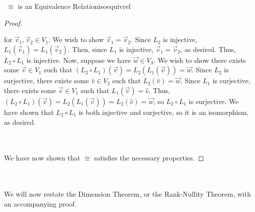 \begin{theorem}{\Stop\,\,\(\cong\) is an Equivalence Relation}{isoequivrel}
\begin{proof}
\begin{enumerate}
                    for \(\vec{v}_1,\vec{v}_2\in V_1\). We wish to show \(\vec{v}_1=\vec{v}_2\). Since \(L_2\) is injective, \(L_1(\vec{v}_1)=L_1(\vec{v}_2)\). Then, since \(L_1\) is injective, \(\vec{v}_1=\vec{v}_2\), as desired. Thus, \(L_2\circ L_1\) is injective. Now, suppose we have \(\vec{w}\in V_3\). We wish to show there exists some \(\vec{v}\in V_1\) such that \((L_2\circ L_1)(\vec{v})=L_2(L_1(\vec{v}))=\vec{w}\). Since \(L_2\) is surjective, there exists some \(\hat{v}\in V_2\) such that \(L_2(\hat{v})=\vec{w}\). Since \(L_1\) is surjective, there exists some \(\vec{v}\in V_1\) such that \(L_1(\vec{v})=\hat{v}\). Thus, \((L_2\circ L_1)(\vec{v})=L_2(L_1(\vec{v}))=L_2(\hat{v})=\vec{w}\), so \(L_2\circ L_1\) is surjective. We have shown that \(L_2\circ L_1\) is both injective and surjective, so it is an isomorphism, as desired.
                \end{enumerate}
                \vphantom
                \\
                \\
                We have now shown that \(\cong\) satisfies the necessary properties.
            \end{proof}

        \end{theorem}
        \pagebreak
        \vphantom
        \\
        \\
        We will now restate the Dimension Theorem, or the Rank-Nullity Theorem, with an accompanying proof.
